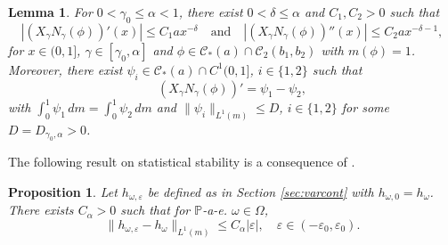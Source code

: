\documentclass[12pt,reqno,a4paper]{article}
\newcommand{\ve}{\varepsilon}
\newtheorem{lemma}[theorem]{Lemma}
\newtheorem{proposition}[theorem]{Proposition}
\begin{document}
\begin{lemma}\label{LEM12}
For $0<\gamma_0 \le \alpha<1$, there exist $0<\delta \le \alpha$  and $C_1, C_2>0$ such that 
\begin{equation}\label{lemm}
|(X_{\gamma}  N_{\gamma}(\phi))'(x)| \le C_1ax^{-\delta} \quad \text{and} \quad 
|(X_{\gamma}  N_{\gamma}(\phi))''(x)| \le C_2a x^{-\delta -1},
\end{equation}
for $x\in (0, 1]$, $\gamma \in [\gamma_0, \alpha]$ and $\phi \in \mathcal C_*(a)\cap \mathcal C_2(b_1, b_2)$ with $m(\phi)=1$. Moreover, there exist $\psi_i \in \mathcal C_*(a)\cap C^1(0, 1]$, $i\in \{1, 2\}$ such that 
\begin{equation}\label{psi12}
(X_\gamma N_\gamma (\phi))'=\psi_1-\psi_2,
\end{equation}
with $\int_0^1 \psi_1 \, dm = \int_0^1 \psi_2\, dm$
and $\| \psi_i\|_{L^1(m)}\le D$, $i \in \{1, 2\}$ for some $D= D_{\gamma_0, \alpha}>0$.
\end{lemma}

The following result on statistical stability is a consequence of \cite[Theorem 13]{DGTS}.

	\begin{proposition}\label{statstab}
	Let $h_{\omega, \ve}$ be defined as in Section \ref{sec:varcont} with $h_{\omega, 0} = h_\omega$. 
	There exists $C_\alpha>0$ such that for $\mathbb P$-a-e. $\omega \in \Omega$,
	\[
	\|h_{\omega, \varepsilon}-h_\omega \|_{L^1(m)} \le C_\alpha |\varepsilon|, \quad \varepsilon \in (-\varepsilon_0, \varepsilon_0).
	\]
\end{proposition}
\end{document}
